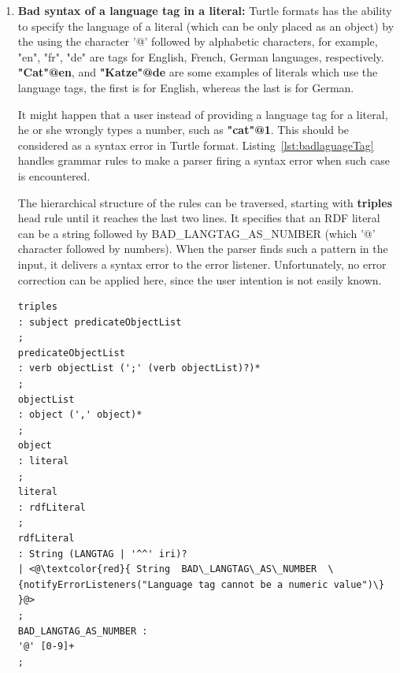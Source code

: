 \begin{enumerate}
\begin{lstlisting}[label=lst:MissuseAex ,  caption={Grammar rules for detecting misuse of 'A' as a predicate instead of 'a'.}] 
statement
: directive
| triples '.'
;
triples
: subject predicateObjectList
;
predicateObjectList
: verb objectList (';' (verb objectList)?)*
;
verb
:'a'
| <@\textcolor{red}{'A' \{notifyErrorListeners("'A' cannot be used as predicate,         }@> 
<@\textcolor{red}{
it should be replaced with 'a'")\}} @>
;
\end{lstlisting}

\item \textbf{Bad syntax of a language tag in a literal:} 
Turtle formats has the ability to specify the language of a literal (which can be only placed as an object) by the using the character '@' followed by alphabetic characters, for example, "en", "fr", "de" are tags for English, French, German languages, respectively. 
\textbf{"Cat"@en}, and \textbf{"Katze"@de} are some examples of literals which use the language tags, the first is for English, whereas the last is for German. 


It might happen that a user instead of providing a language tag for a literal, he or she wrongly types a number, such as \textbf{"cat"@1}.
This should be considered as a syntax error in Turtle format. 
Listing~\ref{lst:badlaguageTag} handles grammar rules to make a parser firing a syntax error when such case is encountered. 

The hierarchical structure of the rules can be traversed, starting with \textbf{triples} head rule until it reaches the last two lines.
It specifies that an RDF literal can be a string followed by BAD\_LANGTAG\_AS\_NUMBER (which '@' character followed by numbers). 
When the parser finds such a pattern in the input, it delivers a syntax error to the error listener. 
Unfortunately, no error correction can be applied here, since the user intention is not easily known.  

\begin{lstlisting}[label=lst:badlaguageTag,  caption={Grammar rules for detecting incorrect language tag with a number instead of characters.}] 
triples
: subject predicateObjectList
;
predicateObjectList
: verb objectList (';' (verb objectList)?)*
;
objectList
: object (',' object)*
;
object
: literal
;
literal
: rdfLiteral
;
rdfLiteral
: String (LANGTAG | '^^' iri)?
| <@\textcolor{red}{ String  BAD\_LANGTAG\_AS\_NUMBER  \{notifyErrorListeners("Language tag cannot be a numeric value")\} }@>
;
BAD_LANGTAG_AS_NUMBER : 
'@' [0-9]+
;
\end{lstlisting}
\end{enumerate}
